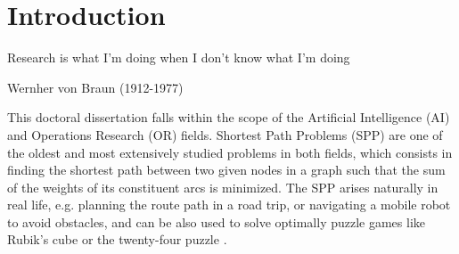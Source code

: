%
%
%
%
%
%

\chapter{Introduction}
\label{chapIntroduction}


\begin{FraseCelebre}
\begin{Frase}
Research is what I'm doing when I don't know what I'm doing
\end{Frase}
\begin{Fuente}
Wernher von Braun (1912-1977)
\end{Fuente}
\end{FraseCelebre}
%

This doctoral dissertation falls within the scope of the Artificial Intelligence (AI) and Operations Research (OR) fields. Shortest Path Problems (SPP) are one of the oldest and most extensively studied problems in both fields, which consists in finding the shortest path between two given nodes in a graph such that the sum of the weights of its constituent arcs is minimized. The SPP arises naturally in real life, e.g. planning the route path in a road trip, or navigating a mobile robot to avoid obstacles, and can be also used to solve optimally puzzle games like Rubik's cube \citep{Korf1997} or the twenty-four puzzle \citep{Korf1996}.

